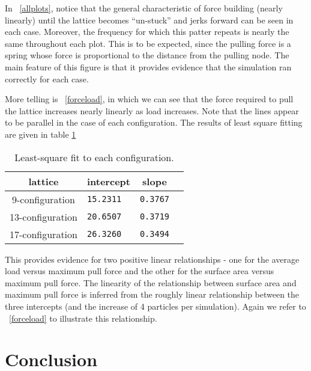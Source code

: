\documentclass[12pt]{amsart}
\newcommand{\figref}[1]{\figurename~\ref{#1}}
\begin{document}
In \figref{allplots}, notice that the general characteristic of force building
(nearly linearly) until the lattice becomes ``un-stuck'' and jerks forward can
be seen in each case.  Moreover, the frequency for which this patter repeats is
nearly the same throughout each plot.  This is to be expected, since the
pulling force is a spring whose force is proportional to the distance from the
pulling node.  The main feature of this figure is that it provides evidence
that the simulation ran correctly for each case.  

More telling is \figref{forceload}, in which we can see that the force required
to pull the lattice increases nearly linearly as load increases.  Note that the
lines appear to be parallel in the case of each configuration.  The results of
least square fitting are given in table \ref{lstsq}

\begin{table}[H]
\begin{tabular}{c| l c c }
lattice		& intercept & slope\\ \hline
9-configuration & \texttt{15.2311} & \texttt{0.3767}\\
13-configuration& \texttt{20.6507} & \texttt{0.3719}\\
17-configuration& \texttt{26.3260} & \texttt{0.3494}\\
\end{tabular}
\caption{Least-square fit to each configuration. }
\label{lstsq}
\end{table}


This provides evidence for two positive linear relationships - one for the average load versus
maximum pull force and the other for the surface area versus maximum pull force. The
linearity of the relationship between surface area and maximum pull force is inferred from the 
roughly linear relationship between the three intercepts (and the increase of 4 particles per simulation). Again we refer to \figref{forceload} to illustrate  this relationship.
 
\section{Conclusion}
\end{document}
